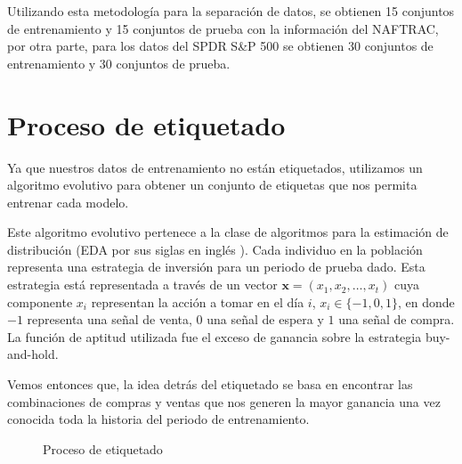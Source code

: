 \documentclass[onesided, 12pt]{scrbook}
\theoremstyle{break}
\begin{document}
Utilizando esta metodología para la separación de datos, se obtienen 15 conjuntos de entrenamiento y 15 conjuntos de prueba con la información del NAFTRAC, por otra parte, para los datos del SPDR S\&P 500 se obtienen 30 conjuntos de entrenamiento y 30 conjuntos de prueba.

\section{Proceso de etiquetado}
\label{seccion:proceso etiquetado}
Ya que nuestros datos de entrenamiento no están etiquetados, utilizamos un algoritmo evolutivo para obtener un conjunto de etiquetas que nos permita entrenar cada modelo.

Este algoritmo evolutivo pertenece a la clase de algoritmos para la estimación de distribución (EDA por sus siglas en inglés \cite{simon2013evolutionary}). Cada individuo en la población representa una estrategia de inversión para un periodo de prueba dado. Esta estrategia está representada a través de un vector $\mathbf{x} = (x_1, x_2, \ldots, x_t)$ cuya componente $x_i$ representan la acción a tomar en el día $i$, $x_i \in \{-1,0,1\}$, en donde $-1$ representa una señal de venta, $0$ una señal de espera y $1$ una señal de compra. La función de aptitud utilizada fue el exceso de ganancia sobre la estrategia buy-and-hold.

Vemos entonces que,  la idea detrás del etiquetado se basa en encontrar las combinaciones de compras y ventas que nos generen la mayor ganancia una vez conocida toda la historia del periodo de entrenamiento.

\begin{figure}[h]
\centering
{}
\caption{\label{imagen:etiquetado} Proceso de etiquetado}
\end{figure}
\end{document}
